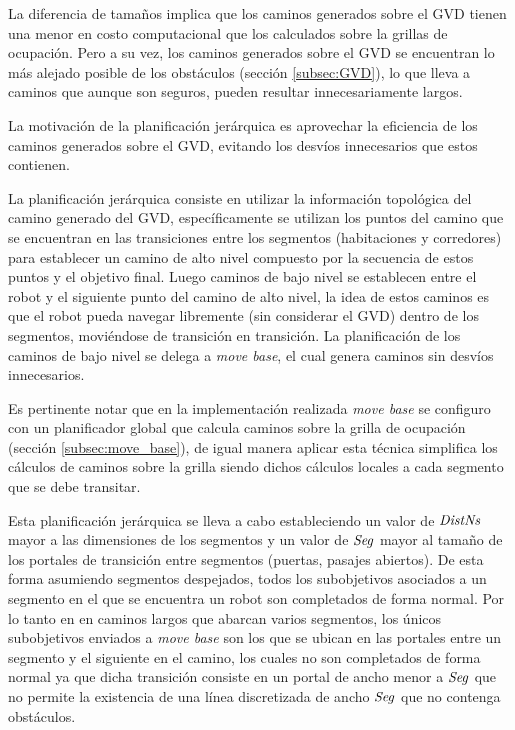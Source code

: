 La diferencia de tamaños implica que los caminos generados sobre el GVD tienen
una menor en costo computacional que los calculados sobre la grillas de
ocupación. Pero a su vez, los caminos generados sobre el GVD se encuentran lo
más alejado posible de los obstáculos (sección \ref{subsec:GVD}), lo que lleva a
caminos que aunque son seguros, pueden resultar innecesariamente largos.

La motivación de la planificación jerárquica es aprovechar la eficiencia de los
caminos generados sobre el GVD, evitando los desvíos innecesarios que estos
contienen.

La planificación jerárquica consiste en utilizar la información
topológica del camino generado del GVD, específicamente se utilizan los
puntos del camino que se encuentran en las transiciones entre los
segmentos (habitaciones y corredores) para establecer un camino de alto
nivel compuesto por la secuencia de estos puntos y el objetivo final.
Luego caminos de bajo nivel se establecen entre el robot y el siguiente
punto del camino de alto nivel, la idea de estos caminos es que el robot
pueda navegar libremente (sin considerar el GVD) dentro de los
segmentos, moviéndose de transición en transición. La planificación de
los caminos de bajo nivel se delega a \emph{move base}, el cual genera
caminos sin desvíos innecesarios.

Es pertinente notar que en la implementación realizada \emph{move base} se
configuro con un planificador global que calcula caminos sobre la grilla de
ocupación (sección \ref{subsec:move_base}), de igual manera aplicar esta
técnica simplifica los cálculos de caminos sobre la grilla siendo dichos
cálculos locales a cada segmento que se debe transitar.

Esta planificación jerárquica se lleva a cabo estableciendo un valor de
$\mathit{DistNs}$ mayor a las dimensiones de los segmentos y un valor de
$\mathit{Seg}$ mayor al tamaño de los portales de transición entre
segmentos (puertas, pasajes abiertos). De esta forma asumiendo segmentos
despejados, todos los subobjetivos asociados a un segmento en el que se
encuentra un robot son completados de forma normal. Por lo tanto en en
caminos largos que abarcan varios segmentos, los únicos subobjetivos
enviados a \emph{move base} son los que se ubican en las portales entre
un segmento y el siguiente en el camino, los cuales no son completados
de forma normal ya que dicha transición consiste en un portal de ancho
menor a $\mathit{Seg}$ que no permite la existencia de una línea
discretizada de ancho $\mathit{Seg}$ que no contenga obstáculos.

